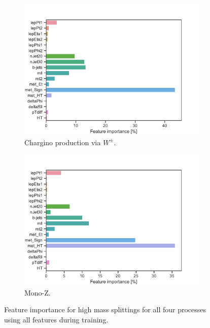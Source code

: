 \begin{figure}[H]
    \begin{subfigure}[t!]{0.49\textwidth}
        \includegraphics[width = \textwidth]{Figures/WW/BDT/All_level/High/featureImportance.pdf}
        \caption{Chargino production via $W^\pm$.}
        \label{fig:featWWHigh}
    \end{subfigure}
    \begin{subfigure}[t!]{0.49\textwidth}
        \includegraphics[width = \textwidth]{Figures/Mono_Z/ML/BDT/All_level/High/featureImportance.pdf}
        \caption{Mono-Z.}
        \label{fig:featMonoZHigh}
    \end{subfigure}
    \caption{Feature importance for high mass splittings for all four processes using all features during training.}
    \label{fig:AllHighfeatBDT}
\end{figure}

